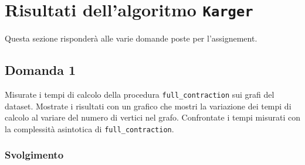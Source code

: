 \section{Risultati dell'algoritmo \texttt{Karger}}
Questa sezione risponderà alle varie domande poste per l'assignement.

\subsection{Domanda 1}
Misurate i tempi di calcolo della procedura \texttt{full\_contraction} sui grafi del dataset. Mostrate i risultati con un grafico che mostri la variazione dei tempi di calcolo al variare del numero di vertici nel grafo. Confrontate i tempi misurati con la complessità asintotica di \texttt{full\_contraction}.

\subsubsection{Svolgimento}

